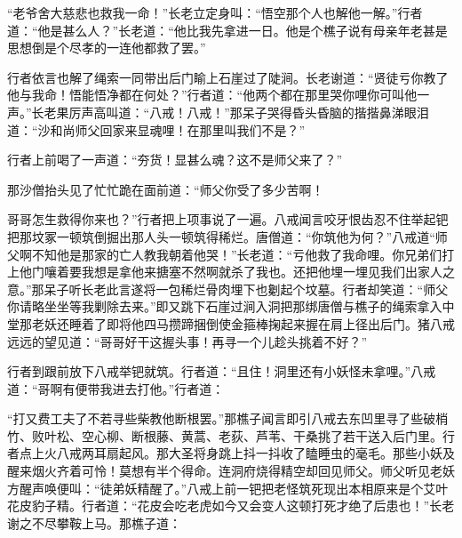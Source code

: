 \documentclass[12pt,UTF8]{ctexbook}
\begin{document}
{	“老爷舍大慈悲也救我一命！”长老立定身叫：“悟空那个人也解他一解。”行者道：“他是甚么人？”长老道：“他比我先拿进一日。他是个樵子说有母亲年老甚是思想倒是个尽孝的一连他都救了罢。”
	
	行者依言也解了绳索一同带出后门睮上石崖过了陡涧。长老谢道：“贤徒亏你教了他与我命！悟能悟净都在何处？”行者道：“他两个都在那里哭你哩你可叫他一声。”长老果厉声高叫道：“八戒！八戒！”那呆子哭得昏头昏脑的揩揩鼻涕眼泪道：“沙和尚师父回家来显魂哩！在那里叫我们不是？”
	
	行者上前喝了一声道：“夯货！显甚么魂？这不是师父来了？”
	
	那沙僧抬头见了忙忙跪在面前道：“师父你受了多少苦啊！
	
	哥哥怎生救得你来也？”行者把上项事说了一遍。八戒闻言咬牙恨齿忍不住举起钯把那坟冢一顿筑倒掘出那人头一顿筑得稀烂。唐僧道：“你筑他为何？”八戒道“师父啊不知他是那家的亡人教我朝着他哭！”长老道：“亏他救了我命哩。你兄弟们打上他门嚷着要我想是拿他来搪塞不然啊就杀了我也。还把他埋一埋见我们出家人之意。”那呆子听长老此言遂将一包稀烂骨肉埋下也劖起个坟墓。行者却笑道：“师父你请略坐坐等我剿除去来。”即又跳下石崖过涧入洞把那绑唐僧与樵子的绳索拿入中堂那老妖还睡着了即将他四马攒蹄捆倒使金箍棒掬起来握在肩上径出后门。猪八戒远远的望见道：“哥哥好干这握头事！再寻一个儿趁头挑着不好？”
	
	行者到跟前放下八戒举钯就筑。行者道：“且住！洞里还有小妖怪未拿哩。”八戒道：“哥啊有便带我进去打他。”行者道：
	
	“打又费工夫了不若寻些柴教他断根罢。”那樵子闻言即引八戒去东凹里寻了些破梢竹、败叶松、空心柳、断根藤、黄蒿、老荻、芦苇、干桑挑了若干送入后门里。行者点上火八戒两耳扇起风。那大圣将身跳上抖一抖收了瞌睡虫的毫毛。那些小妖及醒来烟火齐着可怜！莫想有半个得命。连洞府烧得精空却回见师父。师父听见老妖方醒声唤便叫：“徒弟妖精醒了。”八戒上前一钯把老怪筑死现出本相原来是个艾叶花皮豹子精。行者道：“花皮会吃老虎如今又会变人这顿打死才绝了后患也！”长老谢之不尽攀鞍上马。那樵子道：
	
}
\end{document}
